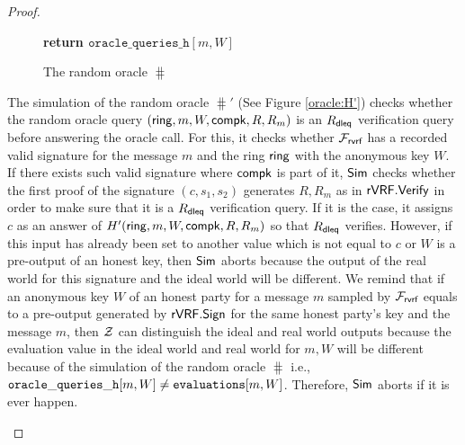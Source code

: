 \begin{proof}
\begin{itemize}
\begin{figure}
{{					%
					
					\textbf{return $  \mathtt{oracle\_queries\_h}[m,  W] $}
					
			}}	
			\caption{The random oracle $ \hash $}
			\label{oracle:HnoPK}
		\end{figure}
		
		The simulation of the random oracle $ \hash' $ (See Figure \ref{oracle:H'}) checks whether the random oracle query $ (\mathsf{ring},m,W,\mathsf{compk},R,R_m) $ is an $ R_{\mathsf{dleq}} $ verification query before answering the oracle call. For this, it checks whether $ \mathcal{F}_{\textsf{rvrf}} $ has a recorded valid signature for the message $ m $ and the ring $ \mathsf{ring} $ with the anonymous key $ W $. If there exists such valid signature where $ \mathsf{compk} $ is part of it, $ \mathsf{Sim} $ checks whether the first proof of the signature $ (c,s_1, s_2) $ generates $ R, R_m $ as in $ {\mathsf{rVRF}}.{\mathsf{Verify}} $ in order to make sure that it is a $ R_{\mathsf{dleq}} $ verification query. If it is the case, it assigns $ c $ as an answer of $ H' (\mathsf{ring},m,W,\mathsf{compk},R,R_m) $ so that $ R_{\mathsf{dleq}} $ verifies. However, if this input has already been set to another value which is not equal to $ c $ or $ W $ is a pre-output of an honest key, then $ \mathsf{Sim} $ aborts because the output of the real world for this signature and the ideal world will be different.
		We remind that if an anonymous key $ W $ of an honest party  for a message $ m $ sampled by $ \mathcal{F}_{\textsf{rvrf}} $ equals to a pre-output generated by $ {\mathsf{rVRF}}.{\mathsf{Sign}} $  for the same honest party's key and the message $ m $, then $ \mathcal{Z} $ can distinguish the ideal and real world outputs because the evaluation value in the ideal world and real world for $ m,W $ will be different because of the simulation of the random oracle $ \hash $ i.e., $ \mathtt{oracle\_queries\_h}[m,W] \neq \texttt{evaluations}[m,W] $.  Therefore, $ \mathsf{Sim} $ aborts if it is ever happen.
		
		\begin{figure}
			\centering
			
			\noindent{}
\end{figure}
\end{itemize}
\end{proof}

